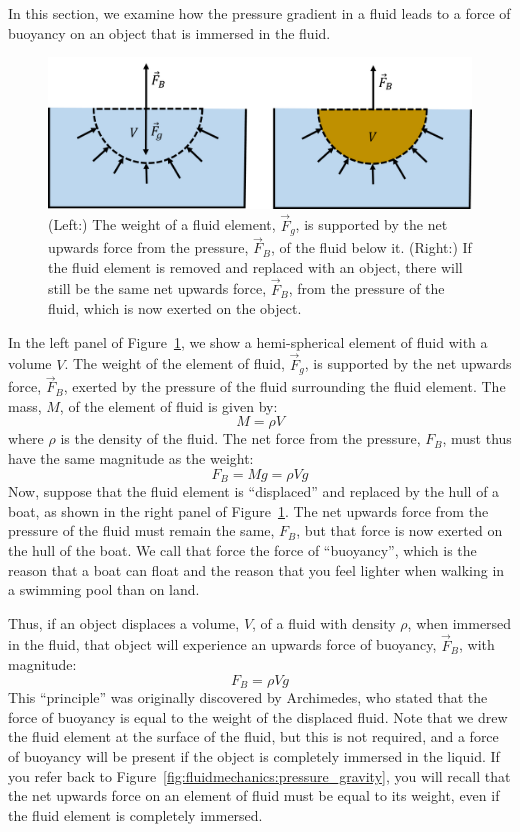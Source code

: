 In this section, we examine how the pressure gradient in a fluid leads to a force of buoyancy on an object that is immersed in the fluid.

\begin{figure}[!htbp]
\centering
\includegraphics[width=0.7\linewidth]{files/buoyant-ea529a7a112b2f4a49686e7f9a49e604.png}
\caption[]{(Left:) The weight of a fluid element, $\vec F_g$, is supported by the net upwards force from the pressure, $\vec F_B$, of the fluid below it. (Right:) If the fluid element is removed and replaced with an object, there will still be the same net upwards force, $\vec F_B$, from the pressure of the fluid, which is now exerted on the object.}
\label{fig:fluidmechanics:buoyant}
\end{figure}

In the left panel of Figure~\ref{fig:fluidmechanics:buoyant}, we show a hemi-spherical element of fluid with a volume $V$. The weight of the element of fluid, $\vec F_g$, is supported by the net upwards force, $\vec F_B$, exerted by the pressure of the fluid surrounding the fluid element. The mass, $M$, of the element of fluid is given by:
\begin{equation}
M = \rho V
\end{equation}
where $\rho$ is the density of the fluid. The net force from the pressure, $F_B$, must thus have the same magnitude as the weight:
\begin{equation}
F_B = Mg = \rho V g
\end{equation}
Now, suppose that the fluid element is ``displaced'' and replaced by the hull of a boat, as shown in the right panel of Figure~\ref{fig:fluidmechanics:buoyant}. The net upwards force from the pressure of the fluid must remain the same, $F_B$, but that force is now exerted on the hull of the boat. We call that force the force of ``buoyancy'', which is the reason that a boat can float and the reason that you feel lighter when walking in a swimming pool than on land.

Thus, if an object displaces a volume, $V$, of a fluid with density $\rho$, when immersed in the fluid, that object will experience an upwards force of buoyancy, $\vec F_B$, with magnitude:
\begin{equation}
\boxed{F_B = \rho V g}
\end{equation}
This ``principle'' was originally discovered by Archimedes, who stated that the force of buoyancy is equal to the weight of the displaced fluid. Note that we drew the fluid element at the surface of the fluid, but this is not required, and a force of buoyancy will be present if the object is completely immersed in the liquid. If you refer back to Figure~\ref{fig:fluidmechanics:pressure_gravity}, you will recall that the net upwards force on an element of fluid must be equal to its weight, even if the fluid element is completely immersed.

